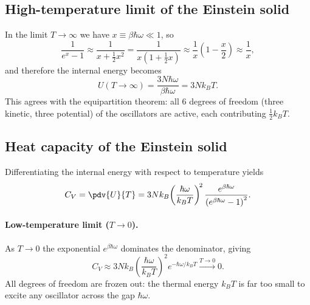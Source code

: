 

\subsection*{High-temperature limit of the Einstein solid}

In the limit $T \to \infty$ we have $x \equiv \beta\hbar\omega \ll 1$, so
\begin{equation}
    \frac{1}{e^x - 1} \approx \frac{1}{x + \tfrac{1}{2}x^2}
    = \frac{1}{x\!\left(1+\tfrac{1}{2}x\right)} \approx \frac{1}{x}\!\left(1-\frac{x}{2}\right)
    \approx \frac{1}{x},
\end{equation}
and therefore the internal energy becomes
\begin{equation}
    U(T\to\infty) = \frac{3N\hbar\omega}{\beta\hbar\omega} = 3Nk_BT.
\end{equation}
This agrees with the equipartition theorem: all $6$ degrees of freedom (three kinetic, three potential) of the oscillators are active, each contributing $\tfrac{1}{2}k_BT$.

\subsection*{Heat capacity of the Einstein solid}

Differentiating the internal energy with respect to temperature yields
\begin{equation}
    C_V = \pdv{U}{T} = 3Nk_B\!\left(\frac{\hbar\omega}{k_BT}\right)^{\!2}
    \frac{e^{\beta\hbar\omega}}{\left(e^{\beta\hbar\omega}-1\right)^2}.
\end{equation}

\paragraph{Low-temperature limit ($T\to 0$).}  As $T\to 0$ the exponential
$e^{\beta\hbar\omega}$ dominates the denominator, giving
\begin{equation}
    C_V \approx 3Nk_B\!\left(\frac{\hbar\omega}{k_BT}\right)^{\!2}
    e^{-\hbar\omega/k_BT} \xrightarrow{T\to 0} 0.
\end{equation}
All degrees of freedom are frozen out: the thermal energy $k_BT$ is far too small
to excite any oscillator across the gap $\hbar\omega$.

